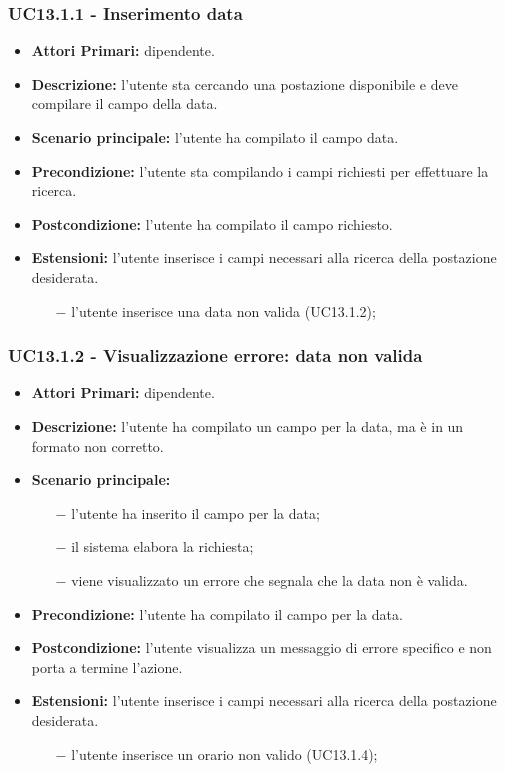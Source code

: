 \subsubsection{ UC13.1.1 - Inserimento data }
\begin{itemize}
	\item\textbf{Attori Primari:} dipendente.
	\item\textbf{Descrizione:} l’utente sta cercando una postazione disponibile e deve compilare il campo della data.
	\item\textbf{Scenario principale:} l’utente ha compilato il campo data.
	\item\textbf{Precondizione:} l’utente sta compilando i campi richiesti per effettuare la ricerca.
	\item\textbf{Postcondizione:} l’utente ha compilato il campo richiesto.
	\item\textbf{Estensioni:} l’utente inserisce i campi necessari alla ricerca della postazione desiderata.
	\begin{itemize}
		\item[$-$] l’utente inserisce una data non valida (UC13.1.2);
	\end{itemize}
\end{itemize}
\subsubsection{ UC13.1.2 - Visualizzazione errore: data non valida  }
\begin{itemize}
	\item\textbf{Attori Primari:} dipendente.
	\item\textbf{Descrizione:} l’utente ha compilato un campo per la data, ma è in un formato non corretto.
	\item\textbf{Scenario principale:} 
	\begin{itemize}
		\item[$-$] l’utente ha inserito il campo per la data;
		\item[$-$] il sistema elabora la richiesta;
		\item[$-$] viene visualizzato un errore che segnala che la data non è valida.
	\end{itemize}
	\item\textbf{Precondizione:} l’utente ha compilato il campo per la data.
	\item\textbf{Postcondizione:} l’utente visualizza un messaggio di errore specifico e non porta a termine l’azione.
	\item\textbf{Estensioni:} l’utente inserisce i campi necessari alla ricerca della postazione desiderata.
	\begin{itemize}
		\item[$-$] l’utente inserisce un orario non valido (UC13.1.4);
	\end{itemize}
\end{itemize}
